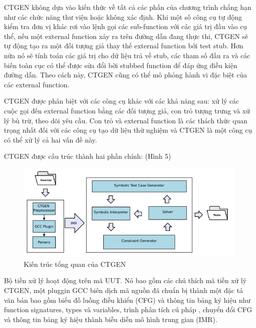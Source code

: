 \documentclass[12pt,a4paper]{article}
\begin{document}
\indent CTGEN không dựa vào kiến thức về tất cả các phần của chương trình chẳng hạn như các chức năng thư viện hoặc không xác định. Khi một số công cụ tự động kiểm tra đơn vị khác rơi vào lệnh gọi các sub-function với các giá trị đầu vào cụ thể, nếu một external function xảy ra trên đường dẫn đang thực thi, CTGEN sẽ tự động tạo ra một đối tượng giả thay thế external function bởi test stub. Hơn nữa nó sẽ tính toán các giá trị cho dữ liệu trả về stub, các tham số đầu ra và các biến toàn cục có thể được sửa đổi bời stubbed function để đáp ứng điều kiện đường dẫn. Theo cách này, CTGEN cũng có thể mô phỏng hành vi đặc biệt của các external function.

\indent CTGEN được phân biệt với các công cụ khác với các khả năng sau: xử lý các cuộc gọi đến external function bằng các đối tượng giả, con trỏ tượng trưng và xử lý bù trừ, theo dõi yêu cầu. Con trỏ và external function là các thách thức quan trọng nhất đối với các công cụ tạo dữ liệu thử nghiệm và CTGEN là một công cụ có thể xử lý cả hai vấn đề này.

\indent CTGEN được cấu trúc thành hai phần chính: (Hình 5)

\begin{figure}[ht]
\begin{center}
\includegraphics{hinhanh/hinh5}
\end{center}
\caption{Kiến trúc tổng quan của CTGEN}
\end{figure}

\indent Bộ tiền xử lý hoạt động trên mã UUT. Nó bao gồm các chú thích mã tiền xử lý CTGEN, một pluggin GCC biên dịch mã nguồn đã chuẩn bị thành một đặc tả văn bản bao gồm biểu đồ luồng điều khiển (CFG) và thông tin bảng ký hiệu như function signatures, types và variables, trình phân tích cú pháp , chuyển đổi CFG và thông tin bảng ký hiệu thành biễu diễn mô hình trung gian (IMR).
\end{document}
